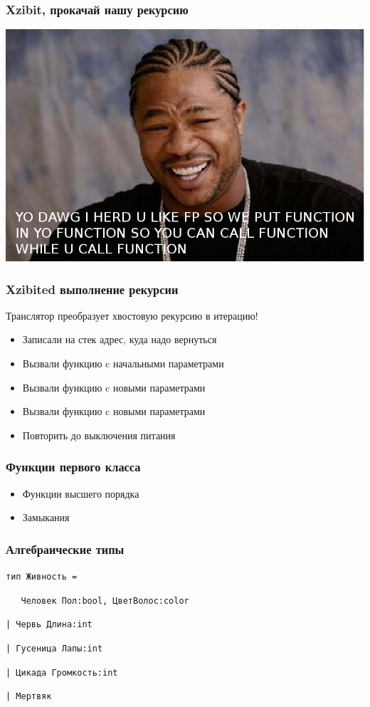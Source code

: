\documentclass{beamer}
\begin{document}
\begin{frame}
  \frametitle{Xzibit, прокачай нашу рекурсию}
  \includegraphics{xzibit-happy.png}
\end{frame}

\begin{frame}
  \frametitle{Xzibited выполнение рекурсии}
  Транслятор преобразует хвостовую рекурсию в итерацию!
  \pause
  \begin{itemize}
  \item Записали на стек адрес, куда надо вернуться
    \pause
  \item Вызвали функцию c начальными параметрами
    \pause
  \item Вызвали функцию c новыми параметрами
    \pause
  \item Вызвали функцию c новыми параметрами
    \pause
  \item Повторить до выключения питания
  \end{itemize}
\end{frame}

\begin{frame}
  \frametitle{Функции первого класса}
  \begin{itemize}
  \item Функции высшего порядка
    \pause
  \item Замыкания
  \end{itemize}
\end{frame}


\begin{frame}
  \frametitle{Алгебраические типы}
  \pause
  \begin{block}{}
    \texttt{{\color{magenta}тип} {\color{blue}Живность} =}
      \pause

      \texttt{\mbox{  } {\color{blue} Человек} Пол:{\color{magenta}bool}, ЦветВолос:{\color{magenta}color}}
      \pause

      \texttt{| {\color{blue}Червь} Длина:{\color{magenta}int}}
      \pause

      \texttt{| {\color{blue}Гусеница} Лапы:{\color{magenta}int}}
      \pause

      \texttt{| {\color{blue}Цикада} Громкость:{\color{magenta}int}}
      \pause

      \texttt{| {\color{blue}Мертвяк}}
  \end{block}
\end{frame}
\end{document}
